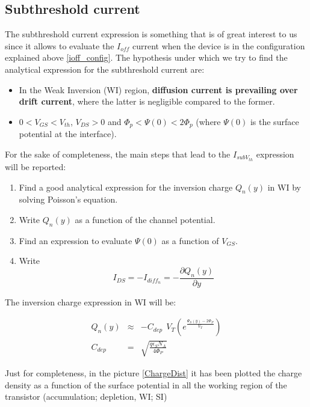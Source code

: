 \documentclass[a4paper, 12pt, twoside, openright]{report}
\begin{document}
\subsection{Subthreshold current} %

The subthreshold current expression is something that is of great interest to us since it allows to evaluate the $I_{off}$ current when the device is in the configuration explained above \ref{ioff_config}. The hypothesis under which we try to find the analytical expression for the subthreshold current are:

\begin{itemize}
\item In the Weak Inversion (WI) region, \textbf{diffusion current is prevailing over drift current}, where the latter is negligible compared to the former.
\item $0<V_{GS}<V_{th}$, $V_{DS}>0$ and $\Phi_{p}<\Psi(0)<2\Phi_{p}$ (where $\Psi(0)$ is the surface potential at the interface). 
\end{itemize}

For the sake of completeness, the main steps that lead to the $I_{subV_{th}}$ expression will be reported:

\begin{enumerate}
\item Find a good analytical expression for the inversion charge $Q_{n}(y)$ in WI by solving Poisson's equation.
\item Write $Q_{n}(y)$ as a function of the channel potential.
\item Find an expression to evaluate $\Psi(0)$ as a function of $V_{GS}$.
\item Write 
\begin{equation}\label{punto4}
I_{DS}=-I_{diff_{n}}=-\frac{\partial Q_{n}(y)}{\partial y}
\end{equation}
\end{enumerate}

The inversion charge expression in WI will be:

	\begin{eqnarray*}
	      Q_n(y)&\approx &-C_{dep}~~V_T
	             \left(e^{\displaystyle \frac{\Psi_S(y)-2\Phi_P}{V_T}}
	              \right)\\[2ex]
	       C_{dep}&=& {\sqrt{\frac{q \epsilon_S N_A}{ 4\Phi_P}}}
	\end{eqnarray*}

Just for completeness, in the picture \ref{ChargeDist} it has been plotted the charge density as a function of the surface potential in all the working region of the transistor (accumulation; depletion, WI; SI)
\end{document}
